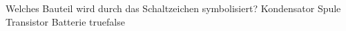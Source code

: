    {Welches Bauteil wird durch das Schaltzeichen symbolisiert?}
    {Kondensator}
    {Spule}
    {Transistor}
    {Batterie}
    {true}{false}